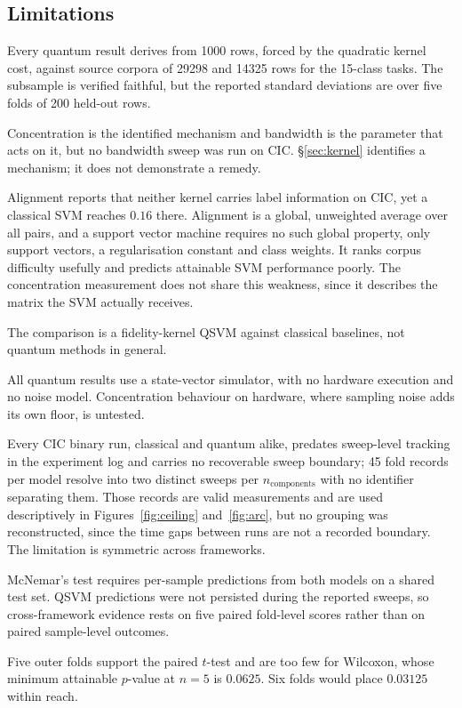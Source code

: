\documentclass[11pt]{article}
\newcommand{\nc}{\ensuremath{n_{\mathrm{components}}}}
\begin{document}
\subsection{Limitations}
\label{sec:limits}

\begin{description}[leftmargin=1.2em,style=nextline]
\item[Scale] Every quantum result derives from 1000 rows, forced by the quadratic
kernel cost, against source corpora of \num{29298} and \num{14325} rows for the
15-class tasks. The subsample is verified faithful, but the reported standard
deviations are over five folds of 200 held-out rows.
\item[Bandwidth is untested on CIC] Concentration is the identified mechanism and
bandwidth is the parameter that acts on it, but no bandwidth sweep was run on
CIC. §\ref{sec:kernel} identifies a mechanism; it does not demonstrate a remedy.
\item[Alignment is a weak predictor] Alignment reports that neither kernel carries
label information on CIC, yet a classical SVM reaches $0.16$ there. Alignment is a
global, unweighted average over all pairs, and a support vector machine requires
no such global property, only support vectors, a regularisation constant and
class weights. It ranks corpus difficulty usefully and predicts attainable SVM
performance poorly. The concentration measurement does not share this weakness,
since it describes the matrix the SVM actually receives.
\item[One quantum method] The comparison is a fidelity-kernel QSVM against
classical baselines, not quantum methods in general.
\item[Simulator only] All quantum results use a state-vector simulator, with no
hardware execution and no noise model. Concentration behaviour on hardware, where
sampling noise adds its own floor, is untested.
\item[One configuration is not separable] Every CIC binary run, classical and
quantum alike, predates sweep-level tracking in the experiment log and carries no
recoverable sweep boundary; 45 fold records per model resolve into two distinct
sweeps per \nc{} with no identifier separating them. Those records are valid
measurements and are used descriptively in Figures~\ref{fig:ceiling}
and~\ref{fig:arc}, but no grouping was reconstructed, since the time gaps between
runs are not a recorded boundary. The limitation is symmetric across frameworks.
\item[No sample-level test between frameworks] McNemar's test requires per-sample
predictions from both models on a shared test set. QSVM predictions were not
persisted during the reported sweeps, so cross-framework evidence rests on five
paired fold-level scores rather than on paired sample-level outcomes.
\item[Fold count] Five outer folds support the paired $t$-test and are too few for
Wilcoxon, whose minimum attainable $p$-value at $n=5$ is $0.0625$. Six folds would
place $0.03125$ within reach.
\end{description}
\end{document}
